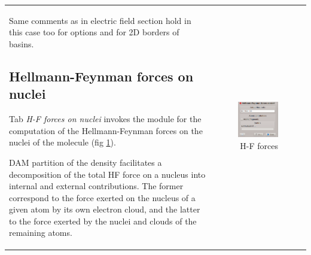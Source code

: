 \documentclass[10pt]{article}
\begin{document}
\vspace*{1mm}
\begin{tabular}{lr}
\hspace*{-3mm}
\begin{minipage}{.6\linewidth}

Same comments as in electric field section hold in this case too for options
and for 2D borders of basins.

\subsection{Hellmann-Feynman forces on nuclei
\label{sec:2.10}\index{Hellmann-Feynman!forces}}

Tab {\it H-F  forces on nuclei}\index{forces} invokes the module for
the computation of the Hellmann-Feynman forces on the nuclei of the molecule
(fig \ref{fig:2_10}).

DAM\index{DAM} partition of the density
facilitates a decomposition of the total HF force on a nucleus into
internal\index{forces!internal} and external\index{forces!external} contributions. 
The former correspond to the force
exerted on the nucleus of a given atom by its own electron cloud, and the
latter to the force exerted by the nuclei and clouds of the remaining atoms.

\end{minipage}
&
\begin{minipage}{.4\linewidth}

\vspace*{-1.0cm}
\begin{figure}[H]
\begin{center}
\includegraphics[width=.7\linewidth]{damqt_fig_2_10.png}
\end{center}
\caption{H-F forces\label{fig:2_10}}
\end{figure}
\end{minipage}
\end{tabular}
\vspace*{1pt}
\end{document}

